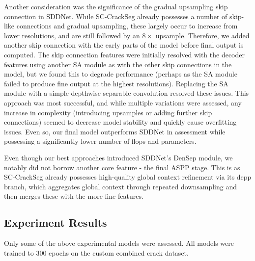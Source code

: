 \documentclass[a4paper,12pt]{report}
\begin{document}
Another consideration was the significance of the gradual upsampling skip connection in SDDNet. While SC-CrackSeg already possesses a number of skip-like connections and gradual upsampling, these largely occur to increase from lower resolutions, and are still followed by an $8 \times$ upsample. Therefore, we added another skip connection with the early parts of the model before final output is computed. The skip connection features were initially resolved with the decoder features using another SA module as with the other skip connections in the model, but we found this to degrade performance (perhaps as the SA module failed to produce fine output at the highest resolutions). Replacing the SA module with a simple depthwise separable convolution resolved these issues. This approach was most successful, and while multiple variations were assessed, any increase in complexity (introducing upsamples or adding further skip connections) seemed to decrease model stability and quickly cause overfitting issues. Even so, our final model outperforms SDDNet in assessment while possessing a significantly lower number of flops and parameters.%



Even though our best approaches introduced SDDNet's DenSep module, we notably did not borrow another core feature - the final ASPP stage. This is as SC-CrackSeg already possesses high-quality global context refinement via its depp branch, which aggregates global context through repeated downsampling and then merges these with the more fine features.

\subsection{Experiment Results}

Only some of the above experimental models were assessed. All models were trained to 300 epochs on the custom combined crack dataset.
\end{document}

